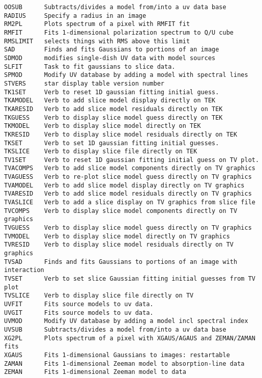 \begin{verbatim}
OOSUB      Subtracts/divides a model from/into a uv data base
RADIUS     Specify a radius in an image
RM2PL      Plots spectrum of a pixel with RMFIT fit
RMFIT      Fits 1-dimensional polarization spectrum to Q/U cube
RMSLIMIT   selects things with RMS above this limit
SAD        Finds and fits Gaussians to portions of an image
SDMOD      modifies single-dish UV data with model sources
SLFIT      Task to fit gaussians to slice data.
SPMOD      Modify UV database by adding a model with spectral lines
STVERS     star display table version number
TK1SET     Verb to reset 1D gaussian fitting initial guess.
TKAMODEL   Verb to add slice model display directly on TEK
TKARESID   Verb to add slice model residuals directly on TEK
TKGUESS    Verb to display slice model guess directly on TEK
TKMODEL    Verb to display slice model directly on TEK
TKRESID    Verb to display slice model residuals directly on TEK
TKSET      Verb to set 1D gaussian fitting initial guesses.
TKSLICE    Verb to display slice file directly on TEK
TV1SET     Verb to reset 1D gaussian fitting initial guess on TV plot.
TVACOMPS   Verb to add slice model components directly on TV graphics
TVAGUESS   Verb to re-plot slice model guess directly on TV graphics
TVAMODEL   Verb to add slice model display directly on TV graphics
TVARESID   Verb to add slice model residuals directly on TV graphics
TVASLICE   Verb to add a slice display on TV graphics from slice file
TVCOMPS    Verb to display slice model components directly on TV graphics
TVGUESS    Verb to display slice model guess directly on TV graphics
TVMODEL    Verb to display slice model directly on TV graphics
TVRESID    Verb to display slice model residuals directly on TV graphics
TVSAD      Finds and fits Gaussians to portions of an image with interaction
TVSET      Verb to set slice Gaussian fitting initial guesses from TV plot
TVSLICE    Verb to display slice file directly on TV
UVFIT      Fits source models to uv data.
UVGIT      Fits source models to uv data.
UVMOD      Modify UV database by adding a model incl spectral index
UVSUB      Subtracts/divides a model from/into a uv data base
XG2PL      Plots spectrum of a pixel with XGAUS/AGAUS and ZEMAN/ZAMAN fits
XGAUS      Fits 1-dimensional Gaussians to images: restartable
ZAMAN      Fits 1-dimensional Zeeman model to absorption-line data
ZEMAN      Fits 1-dimensional Zeeman model to data
\end{verbatim}\eve


